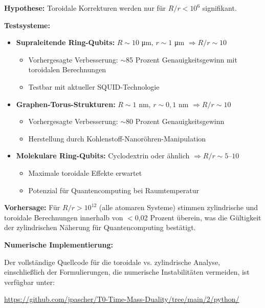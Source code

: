 \begin{experimentbox}
	\textbf{Hypothese:} Toroidale Korrekturen werden nur für $R/r < 10^6$ signifikant.
	
	\textbf{Testsysteme:}
	\begin{itemize}
		\item \textbf{Supraleitende Ring-Qubits:} $R \sim 10$ μm, $r \sim 1$ μm $\Rightarrow R/r \sim 10$
		\begin{itemize}
			\item Vorhergesagte Verbesserung: $\sim$85 Prozent Genauigkeitsgewinn mit toroidalen Berechnungen
			\item Testbar mit aktueller SQUID-Technologie
		\end{itemize}
		
		\item \textbf{Graphen-Torus-Strukturen:} $R \sim 1$ nm, $r \sim 0,\!1$ nm $\Rightarrow R/r \sim 10$
		\begin{itemize}
			\item Vorhergesagte Verbesserung: $\sim$80 Prozent Genauigkeitsgewinn
			\item Herstellung durch Kohlenstoff-Nanoröhren-Manipulation
		\end{itemize}
		
		\item \textbf{Molekulare Ring-Qubits:} Cyclodextrin oder ähnlich $\Rightarrow R/r \sim 5$--$10$
		\begin{itemize}
			\item Maximale toroidale Effekte erwartet
			\item Potenzial für Quantencomputing bei Raumtemperatur
		\end{itemize}
	\end{itemize}
	
	\textbf{Vorhersage:} Für $R/r > 10^{12}$ (alle atomaren Systeme) stimmen zylindrische 
	und toroidale Berechnungen innerhalb von $<$0,02 Prozent überein, was die Gültigkeit der 
	zylindrischen Näherung für Quantencomputing bestätigt.
\end{experimentbox}

\textbf{Numerische Implementierung:}

Der vollständige Quellcode für die toroidale vs. zylindrische Analyse, einschließlich 
der Formulierungen, die numerische Instabilitäten vermeiden, ist verfügbar unter:

\begin{center}
	\url{https://github.com/jpascher/T0-Time-Mass-Duality/tree/main/2/python/}
\end{center}

